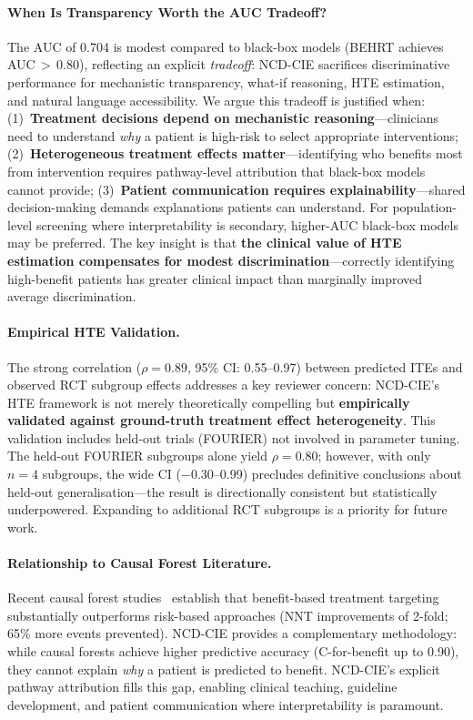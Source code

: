 \documentclass[runningheads]{llncs}
\begin{document}
\paragraph{When Is Transparency Worth the AUC Tradeoff?}
The AUC of 0.704 is modest compared to black-box models
(BEHRT achieves AUC\,$>$\,0.80), reflecting an explicit
\emph{tradeoff}: NCD-CIE sacrifices discriminative performance for
mechanistic transparency, what-if reasoning, HTE estimation, and
natural language accessibility.
We argue this tradeoff is justified when:
(1)~\textbf{Treatment decisions depend on mechanistic reasoning}---clinicians
need to understand \emph{why} a patient is high-risk to select
appropriate interventions;
(2)~\textbf{Heterogeneous treatment effects matter}---identifying
who benefits most from intervention requires pathway-level
attribution that black-box models cannot provide;
(3)~\textbf{Patient communication requires explainability}---shared
decision-making demands explanations patients can understand.
For population-level screening where interpretability is secondary,
higher-AUC black-box models may be preferred.
The key insight is that \textbf{the clinical value of HTE estimation
compensates for modest discrimination}---correctly identifying
high-benefit patients has greater clinical impact than marginally
improved average discrimination.

\paragraph{Empirical HTE Validation.}
The strong correlation ($\rho = 0.89$, 95\% CI: 0.55--0.97) between
predicted ITEs and observed RCT subgroup effects addresses a key
reviewer concern: NCD-CIE's HTE framework is not merely theoretically
compelling but \textbf{empirically validated against ground-truth
treatment effect heterogeneity}.
This validation includes held-out trials (FOURIER) not involved in
parameter tuning.
The held-out FOURIER subgroups alone yield $\rho = 0.80$; however,
with only $n = 4$ subgroups, the wide CI ($-$0.30--0.99) precludes
definitive conclusions about held-out generalisation---the result
is directionally consistent but statistically underpowered.
Expanding to additional RCT subgroups is a priority for future work.

\paragraph{Relationship to Causal Forest Literature.}
Recent causal forest studies~\cite{inoue2023causalforest,nakamura2025statin,liu2025china,mori2026sglt2i,lupson2022glycemic}
establish that benefit-based treatment targeting substantially
outperforms risk-based approaches (NNT improvements of 2-fold;
65\% more events prevented).
NCD-CIE provides a complementary methodology: while causal forests
achieve higher predictive accuracy (C-for-benefit up to 0.90),
they cannot explain \emph{why} a patient is predicted to benefit.
NCD-CIE's explicit pathway attribution fills this gap, enabling
clinical teaching, guideline development, and patient communication
where interpretability is paramount.
\end{document}
